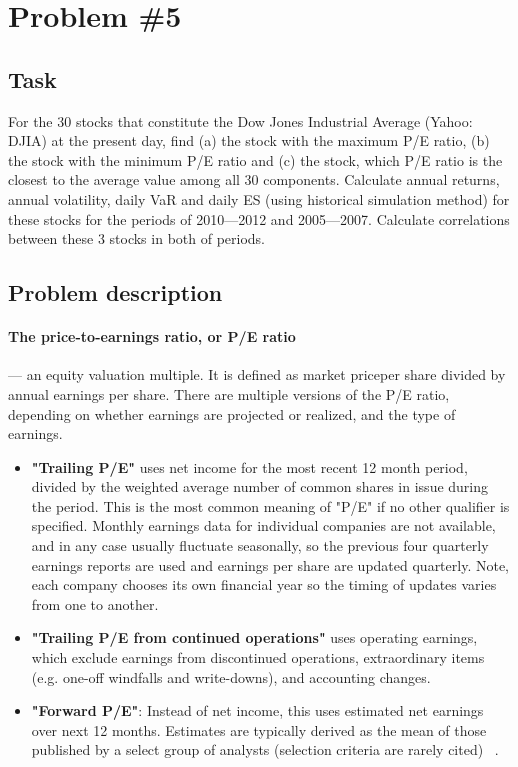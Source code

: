 \newpage \clearpage
\section{Problem \#5}
\label{sec:prob5}

\subsection{Task}
For the 30 stocks that constitute the Dow Jones Industrial Average (Yahoo: DJIA) at the present day, find (a) the stock with the maximum P/E ratio, (b) the stock with the minimum P/E ratio and (c) the stock, which P/E ratio is the closest to the average value among all 30 components. Calculate annual returns, annual volatility, daily VaR and daily ES (using historical simulation method) for these stocks for the periods of 2010---2012 and 2005---2007. Calculate correlations between these 3 stocks in both of periods.

\subsection{Problem description}

\paragraph*{The price-to-earnings ratio, or P/E ratio} --- an equity valuation multiple. It is defined as market priceper share divided by annual earnings per share.
    There are multiple versions of the P/E ratio, depending on whether earnings are projected or realized, and the type of earnings.
\begin{itemize}
	\item{\textbf{"Trailing P/E"} uses net income for the most recent 12 month period, divided by the weighted average number of common shares in issue during the period. This is the most common meaning of "P/E" if no other qualifier is specified. Monthly earnings data for individual companies are not available, and in any case usually fluctuate seasonally, so the previous four quarterly earnings reports are used and earnings per share are updated quarterly. Note, each company chooses its own financial year so the timing of updates varies from one to another.}
	\item{\textbf{"Trailing P/E from continued operations"} uses operating earnings, which exclude earnings from discontinued operations, extraordinary items (e.g. one-off windfalls and write-downs), and accounting changes.}
	\item{\textbf{"Forward P/E"}: Instead of net income, this uses estimated net earnings over next 12 months. Estimates are typically derived as the mean of those published by a select group of analysts (selection criteria are rarely cited) ~\cite{Sel6}.}
\end{itemize}

